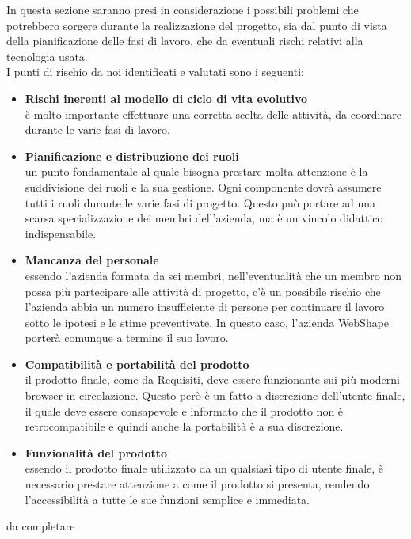In questa sezione saranno presi in considerazione i possibili problemi che potrebbero sorgere durante la realizzazione del progetto, sia dal punto di vista della pianificazione delle fasi di lavoro, che da eventuali rischi relativi alla tecnologia usata.\\
I punti di rischio da noi identificati e valutati sono i seguenti:
\begin{itemize}
\item \textbf{Rischi inerenti al modello di ciclo di vita evolutivo}\\
\`e molto importante effettuare una corretta scelta delle attivit\`a, da coordinare durante le varie fasi di lavoro.\\
\item \textbf{Pianificazione e distribuzione dei ruoli}\\ 
un punto fondamentale al quale bisogna prestare molta attenzione \`e la suddivisione dei ruoli e la sua gestione. Ogni componente dovr\`a assumere tutti i ruoli durante le varie fasi di progetto. Questo pu\`o portare ad una scarsa specializzazione dei membri dell'azienda, ma \`e un vincolo didattico indispensabile.
\item \textbf{Mancanza del personale}\\
essendo l'azienda formata da sei membri, nell'eventualit\`a che un membro non possa pi\`u partecipare alle attivit\`a di progetto, c'\`e un possibile rischio che l'azienda abbia un numero insufficiente di persone per continuare il lavoro sotto le ipotesi e le stime preventivate. In questo caso, l'azienda WebShape porter\`a comunque a termine il suo lavoro.\\
\item \textbf{Compatibilit\`a e portabilit\`a del prodotto}\\
il prodotto finale, come da Requisiti, deve essere funzionante sui pi\`u moderni browser in circolazione. Questo per\`o \`e un fatto a discrezione dell'utente finale, il quale deve essere consapevole e informato che il prodotto non \`e retrocompatibile e quindi anche la portabilit\`a \`e a sua discrezione.
\item \textbf{Funzionalit\`a del prodotto}\\
essendo il prodotto finale utilizzato da un qualsiasi tipo di utente finale, \`e necessario prestare attenzione a come il prodotto si presenta, rendendo l'accessibilit\`a a tutte le sue funzioni semplice e immediata.
\end{itemize}			

da completare\\


